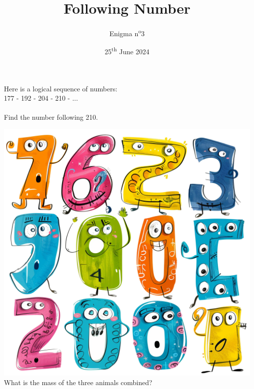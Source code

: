 \documentclass[a4paper, top=10mm]{article}
\title{\textbf{\huge{Following Number}}}
\author{Enigma n\textsuperscript{o}3}
\date{25\textsuperscript{th} June 2024}
\begin{document}
	\maketitle
	
	\Large
	Here is a logical sequence of numbers:\\
	177 - 192 - 204 - 210 - ...\\
	\\
	Find the number following 210.
	
	\begin{center}
		\includegraphics[width=\linewidth]{03image.png}\\
		What is the mass of the three animals combined?
	\end{center}
	
	
	
	
\end{document}
